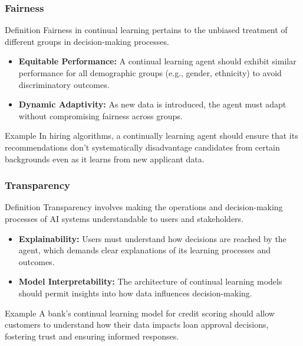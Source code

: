\documentclass[aspectratio=169]{beamer}
\begin{document}
\begin{frame}[fragile]
    \frametitle{Fairness}
    \begin{block}{Definition}
        Fairness in continual learning pertains to the unbiased treatment of different groups in decision-making processes.
    \end{block}
    \begin{itemize}
        \item \textbf{Equitable Performance:} A continual learning agent should exhibit similar performance for all demographic groups (e.g., gender, ethnicity) to avoid discriminatory outcomes.
        \item \textbf{Dynamic Adaptivity:} As new data is introduced, the agent must adapt without compromising fairness across groups.
    \end{itemize}
    \begin{block}{Example}
        In hiring algorithms, a continually learning agent should ensure that its recommendations don't systematically disadvantage candidates from certain backgrounds even as it learns from new applicant data.
    \end{block}
\end{frame}

\begin{frame}[fragile]
    \frametitle{Transparency}
    \begin{block}{Definition}
        Transparency involves making the operations and decision-making processes of AI systems understandable to users and stakeholders.
    \end{block}
    \begin{itemize}
        \item \textbf{Explainability:} Users must understand how decisions are reached by the agent, which demands clear explanations of its learning processes and outcomes.
        \item \textbf{Model Interpretability:} The architecture of continual learning models should permit insights into how data influences decision-making. 
    \end{itemize}
    \begin{block}{Example}
        A bank’s continual learning model for credit scoring should allow customers to understand how their data impacts loan approval decisions, fostering trust and ensuring informed responses.
    \end{block}
\end{frame}
\end{document}
